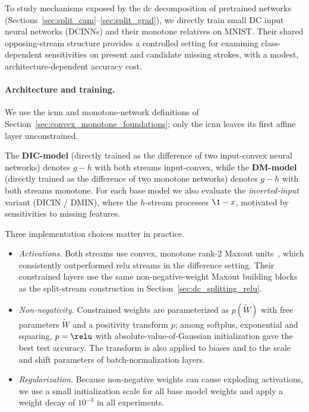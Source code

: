 To study mechanisms exposed by the \ac{dc} decomposition of pretrained networks (Sections~\ref{sec:split_cam}--\ref{sec:split_grad}), we directly train small DC input neural networks (DCINNs) and their monotone relatives on MNIST. Their shared opposing-stream structure provides a controlled setting for examining class-dependent sensitivities on present and candidate missing strokes, with a modest, architecture-dependent accuracy cost.

\paragraph{Architecture and training.}\label{subsec:dcinn_architecture}

We use the \ac{icnn} and monotone-network definitions of Section~\ref{sec:convex_monotone_foundations}; only the \ac{icnn} leaves its first affine layer unconstrained.

The \textbf{DIC-model} (directly trained as the difference of two input-convex neural networks) denotes $g-h$ with both streams input-convex, while the \textbf{DM-model} (directly trained as the difference of two monotone networks) denotes $g-h$ with both streams monotone. For each base model we also evaluate the \emph{inverted-input} variant (DICIN / DMIN), where the $h$-stream processes $\1-x$, motivated by sensitivities to missing features.

Three implementation choices matter in practice.
\begin{itemize}
	\item \emph{Activations.} Both streams use convex, monotone rank-2 Maxout units~\parencite{Goodfellow2013Maxout}, which consistently outperformed \ac{relu} streams in the difference setting. Their constrained layers use the same non-negative-weight Maxout building blocks as the split-stream construction in Section~\ref{sec:dc_splitting_relu}.
	\item \emph{Non-negativity.} Constrained weights are parameterized as $p(\tilde{W})$ with free parameters $\tilde{W}$ and a positivity transform $p$; among softplus, exponential and squaring, $p = \relu$ with absolute-value-of-Gaussian initialization gave the best test accuracy. The transform is also applied to biases and to the scale and shift parameters of batch-normalization layers.
	\item \emph{Regularization.} Because non-negative weights can cause exploding activations, we use a small initialization scale for all base model weights and apply a weight decay of $10^{-3}$ in all experiments.
\end{itemize}

